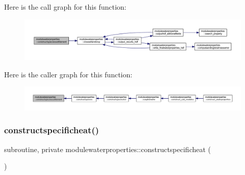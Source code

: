 Here is the call graph for this function\+:\nopagebreak
\begin{figure}[H]
\begin{center}
\leavevmode
\includegraphics[width=350pt]{namespacemodulewaterproperties_a3d2b79958b73c28e20d23afd2fe092ef_cgraph}
\end{center}
\end{figure}
Here is the caller graph for this function\+:\nopagebreak
\begin{figure}[H]
\begin{center}
\leavevmode
\includegraphics[width=350pt]{namespacemodulewaterproperties_a3d2b79958b73c28e20d23afd2fe092ef_icgraph}
\end{center}
\end{figure}
\mbox{\label{namespacemodulewaterproperties_a638275f2c0c184e858bd3e3e3e459901}} 
\subsubsection{\texorpdfstring{constructspecificheat()}{constructspecificheat()}}
{\footnotesize\ttfamily subroutine, private modulewaterproperties\+::constructspecificheat (\begin{DoxyParamCaption}{ }\end{DoxyParamCaption})\hspace{0.3cm}{\ttfamily [private]}}

